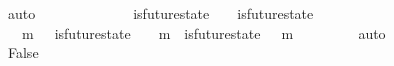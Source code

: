 \begin{isabellebody}
\ auto\isanewline
\ \ \ \ \isamarkupfalse%
\ \isamarkupfalse%
\ {\isachardoublequoteopen}\ {\isasymexists}{\isasymsigma}{\isacharprime}{\isacharprime}{\isachardot}\ {\isasymsigma}{\isacharprime}{\isacharprime}\ {\isasymin}\ {\isasymSigma}\ {\isasymand}\ is{\isacharunderscore}future{\isacharunderscore}state\ {\isacharparenleft}{\isasymsigma}{\isacharcomma}\ {\isasymsigma}{\isacharprime}{\isacharprime}{\isacharparenright}\ {\isasymand}\ is{\isacharunderscore}future{\isacharunderscore}state\ {\isacharparenleft}{\isasymsigma}{\isacharprime}{\isacharprime}{\isacharcomma}\ {\isasymsigma}{\isacharprime}{\isacharparenright}\ {\isasymand}\ {\isasymsigma}\ {\isasymnoteq}\ {\isasymsigma}{\isacharprime}{\isacharprime}\ {\isasymand}\ {\isasymsigma}{\isacharprime}{\isacharprime}\ {\isasymnoteq}\ {\isasymsigma}{\isacharprime}{\isachardoublequoteclose}\ \ \ \ \isanewline
\ \ \ \ \ \ \isamarkupfalse%
\ {\isacartoucheopen}{\isasymsigma}\ {\isasymunion}\ {\isacharbraceleft}m{}{\isacharbraceright}\ {\isasymin}\ {\isasymSigma}{\isacartoucheclose}\ {\isacartoucheopen}is{\isacharunderscore}future{\isacharunderscore}state\ {\isacharparenleft}{\isasymsigma}{\isacharcomma}\ {\isasymsigma}\ {\isasymunion}\ {\isacharbraceleft}m{}{\isacharbraceright}{\isacharparenright}\ {\isasymand}\ is{\isacharunderscore}future{\isacharunderscore}state\ {\isacharparenleft}{\isasymsigma}\ {\isasymunion}\ {\isacharbraceleft}m{}{\isacharbraceright}{\isacharcomma}\ {\isasymsigma}{\isacharprime}{\isacharparenright}{\isacartoucheclose}\isanewline
\ \ \ \ \ \ \isamarkupfalse%
\ auto\ \ \ \ \ \ \isanewline
\ \ \isamarkupfalse%
\isanewline
\ \ \isamarkupfalse%
\ \isamarkupfalse%
\ False\isanewline
\ \ \ \ \isamarkupfalse%

\end{isabellebody}
